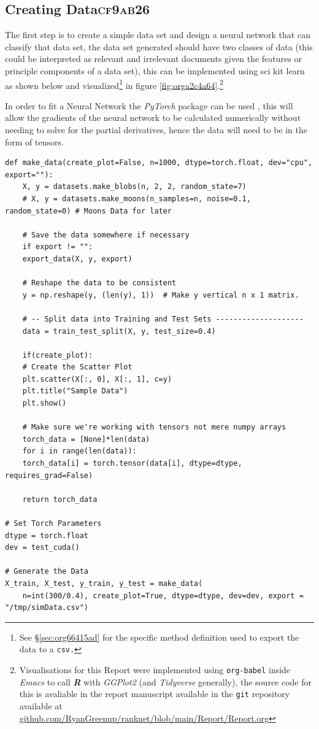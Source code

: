 \documentclass[a4paper,11pt,twoside]{article}
\begin{document}
\subsection{Creating Data\hfill{}\textsc{cf9ab26}}
\label{sec:org7e4bbf4}
The first step is to create a simple data set and design a neural
network that can classify that data set, the data set generated
should have two classes of data (this could be interpreted as
relevant and irrelevant documents given the features or principle
components of a data set), this can be implemented using sci kit
learn as shown below and visualized\footnote{See \S \ref{sec:org66415ad} for the specific method definition used to
export the data to a \texttt{csv.}} in figure \ref{fig:orga2c4a64}.\footnote{Visualisations for this Report were implemented using
\texttt{org-babel} \cite{dominikOrgModeReference2018} inside \emph{Emacs}
\cite{stallmanGNUEmacsManual2002} to call \textbf{\emph{R}}
\cite{rcoreteamLanguageEnvironmentStatistical2021} with \emph{GGPlot2}
\cite{wickhamGgplot2ElegantGraphics2016a} (and \emph{Tidyverse}
\cite{wickhamWelcomeTidyverse2019} generally), the source code for this
is avaliable in the report manuscript available in the \texttt{git} repository
available at \href{https://github.com/RyanGreenup/ranknet/blob/main/Report/Report.org}{github.com/RyanGreenup/ranknet/blob/main/Report/Report.org}}


In order to fit a Neural Network the \emph{PyTorch} package can be used
\cite{NEURIPS2019_9015}, this will allow the gradients of the neural
network to be calculated numerically without needing to solve for
the partial derivatives, hence the data will need to be in the
form of tensors.

\begin{verbatim}
def make_data(create_plot=False, n=1000, dtype=torch.float, dev="cpu", export=""):
    X, y = datasets.make_blobs(n, 2, 2, random_state=7)
    # X, y = datasets.make_moons(n_samples=n, noise=0.1, random_state=0) # Moons Data for later

    # Save the data somewhere if necessary
    if export != "":
	export_data(X, y, export)

    # Reshape the data to be consistent
    y = np.reshape(y, (len(y), 1))  # Make y vertical n x 1 matrix.

    # -- Split data into Training and Test Sets --------------------
    data = train_test_split(X, y, test_size=0.4)

    if(create_plot):
	# Create the Scatter Plot
	plt.scatter(X[:, 0], X[:, 1], c=y)
	plt.title("Sample Data")
	plt.show()

    # Make sure we're working with tensors not mere numpy arrays
    torch_data = [None]*len(data)
    for i in range(len(data)):
	torch_data[i] = torch.tensor(data[i], dtype=dtype, requires_grad=False)

    return torch_data

# Set Torch Parameters
dtype = torch.float
dev = test_cuda()

# Generate the Data
X_train, X_test, y_train, y_test = make_data(
    n=int(300/0.4), create_plot=True, dtype=dtype, dev=dev, export = "/tmp/simData.csv")
\end{verbatim}
\end{document}
